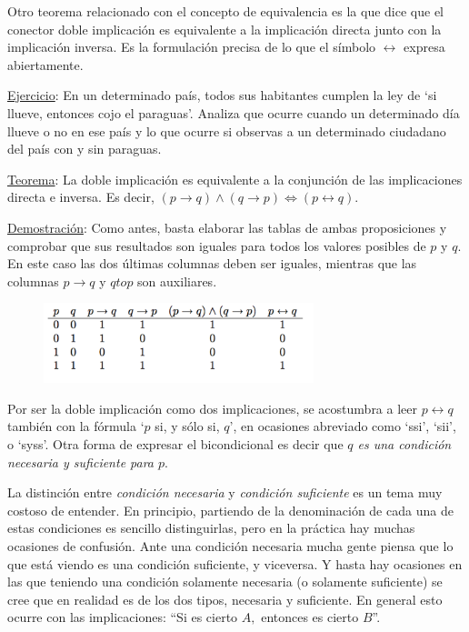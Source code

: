 Otro teorema relacionado con el concepto de equivalencia es la que dice que el conector doble implicación es equivalente a la implicación directa junto con la implicación inversa. Es la formulación precisa de lo que el símbolo $\leftrightarrow$ expresa abiertamente.

\underline{Ejercicio}: En un determinado país, todos sus habitantes cumplen la ley de `si llueve, entonces cojo el paraguas'. Analiza que ocurre cuando un determinado día llueve o no en ese país y lo que ocurre si observas a un determinado ciudadano del país con y sin paraguas.

\underline{Teorema}: La doble implicación es equivalente a la conjunción de las implicaciones directa e inversa. Es decir,   $(p \to q) \wedge (q \to  p) \Leftrightarrow (p \leftrightarrow q)$.

\underline{Demostración}: Como antes, basta elaborar las tablas de ambas proposiciones y comprobar que sus resultados son iguales para todos los valores posibles de $p$ y $q$. En este caso las dos últimas columnas deben ser iguales, mientras que las columnas $p \to q$ y $q to p$ son auxiliares. 

	\begin{figure}[H] 
		\centering
		\includegraphics[width=0.7\textwidth]{imagenes/apendices/APENDICESIM21.png}
	\end{figure}

\rightline{$\Box$}

Por ser la doble implicación como dos implicaciones, se acostumbra a leer $p \leftrightarrow q$ también con la fórmula `$p$ si, y sólo si, $q$', en ocasiones abreviado como `ssi', `sii', o `syss'. Otra forma de expresar el bicondicional es decir que \emph{ $q$ es una condición necesaria y suficiente para $p$}.

La distinción entre \emph{condición necesaria} y \emph{condición suficiente} es un tema muy costoso de entender. En principio, partiendo de la denominación de cada una de estas condiciones es sencillo distinguirlas, pero en la práctica hay muchas ocasiones de confusión. Ante una condición necesaria mucha gente piensa que lo que está viendo es una condición suficiente, y viceversa. Y hasta hay ocasiones en las que teniendo una condición solamente necesaria (o solamente suficiente) se cree que en realidad es de los dos tipos, necesaria y suficiente. En general esto ocurre con las implicaciones: ``Si es cierto $A,$ entonces es cierto $B$''.


